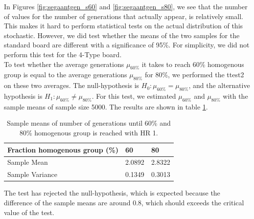 In Figures \ref{fig:segaantgen_s60} and \ref{fig:segaantgen_s80}, we see that the number of values for the number of generations that actually appear, is relatively small. This makes it hard to perform statistical tests on the actual distribution of this stochastic. However, we did test whether the means of the two samples for the standard board are different with a significance of 95\%. For simplicity, we did not perform this test for the 4-Type board.\\

To test whether the average generations $\mu_{60\%}$ it takes to reach 60\% homogenous group is equal to the average generations $\mu_{80\%}$ for 80\%, we performed the ttest2 on these two averages. The null-hypothesis is $H_0:\mu_{60\%}=\mu_{80\%}$, and the alternative hypothesis is $H_1: \mu_{60\%}\neq \mu_{80\%}$. For this test, we estimated $\mu_{60\%}$ and $\mu_{80\%}$ with the sample means of sample size 5000. The results are shown in table \ref{tab:sampmean}.
\begin{table}[H]
\centering
\caption{Sample means of number of generations until 60\% and 80\% homogenous group is reached with HR 1.}
\begin{tabular}{|l|l|l|}
\hline
 Fraction homogenous group (\%)&60&80 \\ \hline
 Sample Mean&2.0892&2.8322  \\
 Sample Variance & 0.1349 & 0.3013\\ \hline 
\end{tabular}
\label{tab:sampmean}
\end{table}
The test has rejected the null-hypothesis, which is expected because the difference of the sample means are around 0.8, which should exceeds the critical value of the test.\\

